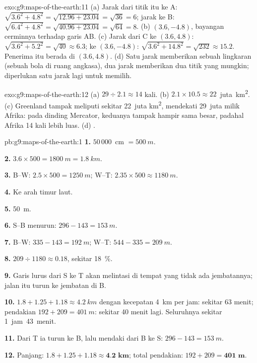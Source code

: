 \begin{solution}{exo:g9:maps-of-the-earth:11}
(a) Jarak dari titik itu ke A: $\sqrt{3.6^2 + 4.8^2} = \sqrt{12.96 + 23.04} =
\sqrt{36} = 6$; jarak ke B: $\sqrt{6.4^2 + 4.8^2} = \sqrt{40.96 +
23.04} = \sqrt{64} = 8$. (b) $(3.6, -4.8)$, bayangan cerminnya terhadap
garis AB. (c) Jarak dari C ke $(3.6, 4.8)$: $\sqrt{3.6^2 + 5.2^2} =
\sqrt{40} \approx 6.3$; ke $(3.6, -4.8)$: $\sqrt{3.6^2 + 14.8^2} =
\sqrt{232} \approx 15.2$. Penerima itu berada di $(3.6, 4.8)$. (d) Satu
jarak memberikan sebuah lingkaran (sebuah bola di ruang angkasa), dua
jarak memberikan dua titik yang mungkin; diperlukan satu jarak lagi untuk
memilih.
\end{solution}

\begin{solution}{exo:g9:maps-of-the-earth:12}
(a) $29 \div 2.1 \approx 14$ kali. (b) $2.1 \times 10.5 \approx
22$~juta~\unit{km^2}. (c) Greenland tampak meliputi sekitar 22~juta
\unit{km^2}, mendekati 29~juta milik Afrika: pada  dinding Mercator,
keduanya tampak hampir sama besar, padahal Afrika 14 kali lebih luas.
(d) .
\end{solution}

\begin{solution}{pb:g9:maps-of-the-earth:1}
\textbf{1.} $50\,000$~cm $= \qty{500}{m}$.

\textbf{2.} $3.6 \times 500 = \qty{1800}{m} = \qty{1.8}{km}$.

\textbf{3.} B--W: $2.5 \times 500 = \qty{1250}{m}$; W--T: $2.35 \times 500
\approx \qty{1180}{m}$.

\textbf{4.} Ke arah timur laut.

\textbf{5.} \qty{50}{m}.

\textbf{6.} S--B menurun: $296 - 143 = \qty{153}{m}$.

\textbf{7.} B--W: $335 - 143 = \qty{192}{m}$; W--T: $544 - 335 =
\qty{209}{m}$.

\textbf{8.} $209 \div 1180 \approx 0.18$, sekitar \qty{18}{\%}.

\textbf{9.} Garis lurus dari S ke T akan melintasi  di tempat yang
tidak ada jembatannya; jalan itu turun ke jembatan di B.

\textbf{10.} $1.8 + 1.25 + 1.18 \approx \qty{4.2}{km}$ dengan kecepatan
\qty{4}{km} per jam: sekitar 63 menit; pendakian
$192 + 209 = \qty{401}{m}$: sekitar 40 menit lagi. Seluruhnya sekitar
1~jam~43~menit.

\textbf{11.} Dari T ia turun ke B, lalu mendaki dari B ke S: $296 -
143 = \qty{153}{m}$.

\textbf{12.} Panjang: $1.8 + 1.25 + 1.18 \approx \textbf{4.2 km}$; total
pendakian: $192 + 209 = \textbf{401 m}$.
\end{solution}
